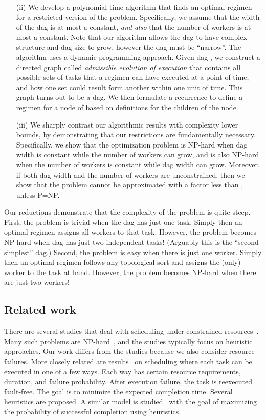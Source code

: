 \documentclass[letterpaper,11pt]{article}
\newcommand{\F}{\vspace*{\smallskipamount}}
\begin{document}
\begin{itemize}
\item[(ii)] We develop a polynomial time algorithm that finds an optimal regimen for a restricted version of the problem. Specifically, we assume that the width of the dag  is at most a constant, {\em and also} that the number of workers is at most a constant. Note that our algorithm allows the dag to have complex structure and dag size to grow, however the dag must be ``narrow''. The algorithm uses a dynamic programming approach. Given dag , we construct a directed graph  called {\em admissible evolution of execution} that contains all possible sets of tasks that a regimen can have executed at a point of time, and how one set could result form another within one unit of time. This graph  turns out to be a dag. We then formulate a recurrence to define a regimen for a node of  based on definitions for the children of the node. 

\item[(iii)] We sharply contrast our algorithmic results with complexity lower bounds, by demonstrating that our restrictions are fundamentally necessary. Specifically, we show that the optimization problem is NP-hard when dag width is constant while the number of workers can grow, and is also NP-hard when the number of workers is constant while dag width can grow. Moreover, if both dag width and the number of workers are unconstrained, then we show that the problem cannot be approximated with a factor less than , unless P=NP.
\end{itemize}


Our reductions demonstrate that the complexity of the problem is quite steep. 
First, the problem is trivial when the dag has just one task. Simply then an optimal regimen assigns all workers to that task. However, the problem becomes NP-hard when dag has just two independent tasks! (Arguably this is the ``second simplest'' dag.) 
Second, the problem is easy when there is just one worker. Simply then an optimal regimen follows any topological sort and assigns the (only) worker to the task at hand. However, the problem becomes NP-hard when there are just two workers! 

\F\F
\subsection{Related work}
There are several studies that deal with scheduling under constrained resources~\cite{OU95,NR01}. Many such problems are NP-hard~\cite{CK04}, and the studies typically focus on heuristic approaches. Our work differs from the studies because we also consider resource failures.
More closely related are results~\cite{MT97} on scheduling where each task can be executed in one of a few ways. Each way has certain resource requirements, duration, and failure probability. After execution failure, the task is reexecuted fault-free. The goal is to minimize the expected completion time. Several heuristics are proposed. A similar model is studied~\cite{TMY95} with the goal of maximizing the probability of successful completion using heuristics.
\end{document}
